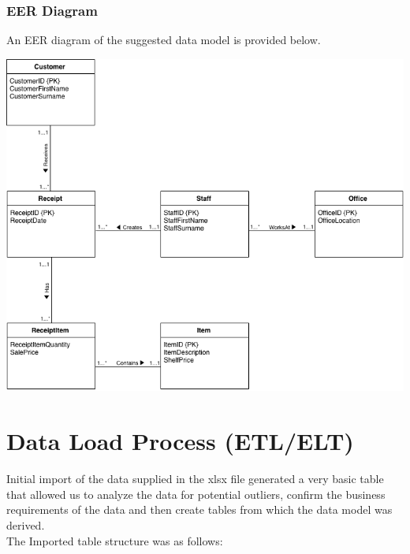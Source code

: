 \documentclass{article}
\begin{document}
    \newpage
    \subsubsection{EER Diagram}
    An EER diagram of the suggested data model is provided below. 

	\vspace{10mm}    
    
    \begin{center}
        \includegraphics[width=\textwidth-40pt,keepaspectratio]{Images/A2-EERModel.png}
    \end{center}




    \newpage
    \section{Data Load Process (ETL/ELT)}
        Initial import of the data supplied in the xlsx file generated a very basic table
        that allowed us to analyze the data for potential outliers, confirm the business
        requirements of the data and then create tables from which the data model was derived.
        \\
        The Imported table structure was as follows:
        \begin{center}
        \end{center}
\end{document}
